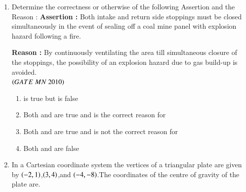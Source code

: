 \documentclass{article}
\begin{document}
\begin{enumerate}[label=Q.\arabic*., itemsep=1em, leftmargin=0pt, itemindent=*, labelsep=0.5em]
\begin{enumerate}[label=(\Alph*), leftmargin=4em, align=left]
    \end{enumerate}
\item  Determine the correctness or otherwise of the following Assertion  and the Reason :
\vspace{0.5em}
\noindent
\textbf{Assertion :} Both intake and return side stoppings must be closed simultaneously in the event of sealing off a coal mine panel with explosion hazard following a fire.

\vspace{0.5em}
\noindent
\textbf{Reason :} By continuously ventilating the area till simultaneous closure of the stoppings, the possibility of an explosion hazard due to gas build-up is avoided.\\
\vspace{1em}
\hfill$\left(GATE\ MN\ 2010\right)$    
\begin{enumerate}[label=(\Alph*), leftmargin=4em, align=left]
    \item {} is true but  is false
    \item Both  and  are true and  is the correct reason for 
    \item Both  and  are true and  is not the correct reason for 
    \item Both  and  are false

\end{enumerate}
\item In a Cartesian coordinate system the vertices of a triangular plate are given by $\left(-2, 1\right)$,$\left(3, 4\right)$,and $\left(-4, -8\right)$.The coordinates of the centre of gravity of the plate are.


\end{enumerate}
\end{document}
